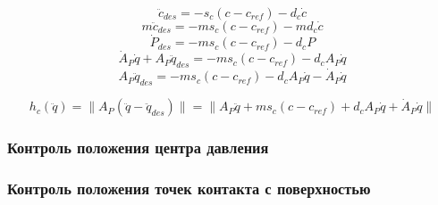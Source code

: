 
\begin{equation*}
  \ddot{c}_{des} = - s_{c} (c - c_{ref}) - d_{c} \dot{c}
\end{equation*}
\begin{equation*}
  m \ddot{c}_{des} = - m s_{c} (c - c_{ref}) - m d_{c} \dot{c}
\end{equation*}
\begin{equation*}
  \dot{P}_{des} = - m s_{c} (c - c_{ref}) - d_{c} P
\end{equation*}
\begin{equation*}
  \dot{A}_{P} \dot{q} + A_{P} \ddot{q}_{des} = - m s_{c} (c - c_{ref}) - d_{c} A_{P} \dot{q}
\end{equation*}
\begin{equation*}
  A_{P} \ddot{q}_{des} = - m s_{c} (c - c_{ref}) - d_{c} A_{P} \dot{q} - \dot{A}_{P} \dot{q}
\end{equation*}


\begin{equation*}
  h_{c}(\ddot{q}) = \lVert A_{P} (\ddot{q} - \ddot{q}_{des} ) \rVert = \lVert A_{P} \ddot{q} + m s_{c} (c - c_{ref}) + d_{c} A_{P} \dot{q} + \dot{A}_{P} \dot{q} \rVert
\end{equation*}






\subsubsection{Контроль положения центра давления}


\subsubsection{Контроль положения точек контакта с поверхностью}

